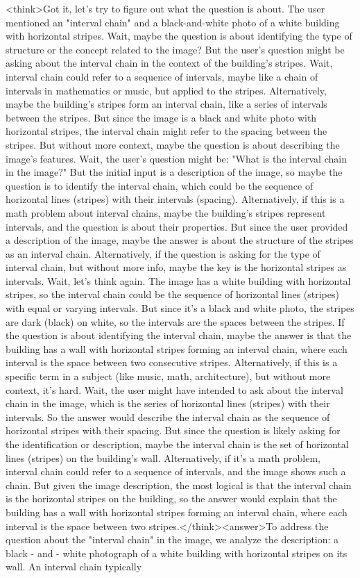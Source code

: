 <think>Got it, let's try to figure out what the question is about. The user mentioned an "interval chain" and a black-and-white photo of a white building with horizontal stripes. Wait, maybe the question is about identifying the type of structure or the concept related to the image? But the user's question might be asking about the interval chain in the context of the building's stripes. Wait, interval chain could refer to a sequence of intervals, maybe like a chain of intervals in mathematics or music, but applied to the stripes. Alternatively, maybe the building's stripes form an interval chain, like a series of intervals between the stripes. But since the image is a black and white photo with horizontal stripes, the interval chain might refer to the spacing between the stripes. But without more context, maybe the question is about describing the image's features. Wait, the user's question might be: "What is the interval chain in the image?" But the initial input is a description of the image, so maybe the question is to identify the interval chain, which could be the sequence of horizontal lines (stripes) with their intervals (spacing). Alternatively, if this is a math problem about interval chains, maybe the building's stripes represent intervals, and the question is about their properties. But since the user provided a description of the image, maybe the answer is about the structure of the stripes as an interval chain. Alternatively, if the question is asking for the type of interval chain, but without more info, maybe the key is the horizontal stripes as intervals. Wait, let's think again. The image has a white building with horizontal stripes, so the interval chain could be the sequence of horizontal lines (stripes) with equal or varying intervals. But since it's a black and white photo, the stripes are dark (black) on white, so the intervals are the spaces between the stripes. If the question is about identifying the interval chain, maybe the answer is that the building has a wall with horizontal stripes forming an interval chain, where each interval is the space between two consecutive stripes. Alternatively, if this is a specific term in a subject (like music, math, architecture), but without more context, it's hard. Wait, the user might have intended to ask about the interval chain in the image, which is the series of horizontal lines (stripes) with their intervals. So the answer would describe the interval chain as the sequence of horizontal stripes with their spacing. But since the question is likely asking for the identification or description, maybe the interval chain is the set of horizontal lines (stripes) on the building's wall. Alternatively, if it's a math problem, interval chain could refer to a sequence of intervals, and the image shows such a chain. But given the image description, the most logical is that the interval chain is the horizontal stripes on the building, so the answer would explain that the building has a wall with horizontal stripes forming an interval chain, where each interval is the space between two stripes.</think><answer>To address the question about the "interval chain" in the image, we analyze the description: a black - and - white photograph of a white building with horizontal stripes on its wall. An interval chain typically 